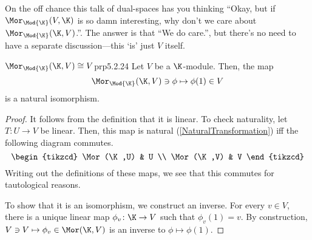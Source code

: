 On the off chance this talk of dual-spaces has you thinking ``Okay, but if $\Mor _{\Mod{\K}}(V,\K )$ is so damn interesting, why don't we care about $\Mor _{\Mod{\K}}(\K ,V)$.''.  The answer is that ``We do care.'', but there's no need to have a separate discussion---this `is' just $V$ itself.
\begin{prp}{$\Mor _{\Mod{\K}}(\K ,V)\cong V$}{prp5.2.24}
	Let $V$ be a $\K$-module.  Then, the map
	\begin{equation}
		\Mor _{\Mod{\K}}(\K ,V)\ni \phi \mapsto \phi (1)\in V
	\end{equation}
	is a natural isomorphism.
	\begin{proof}
		It follows from the definition that it is linear.  To check naturality, let $T\colon U\rightarrow V$ be linear.  Then, this map is natural (\cref{NaturalTransformation}) iff the following diagram commutes.
		\begin{equation}
			\begin{tikzcd}
				\Mor (\K ,U) & U \\
				\Mor (\K ,V) & V
			\end{tikzcd}
		\end{equation}
		Writing out the definitions of these maps, we see that this commutes for tautological reasons.
		
		To show that it is an isomorphism, we construct an inverse.  For every $v\in V$, there is a unique linear map $\phi _v\colon \K \rightarrow V$ such that $\phi _v(1)=v$.  By construction, $V\ni V\mapsto \phi _v\in \Mor (\K ,V)$ is an inverse to $\phi \mapsto \phi (1)$.
	\end{proof}
\end{prp}

